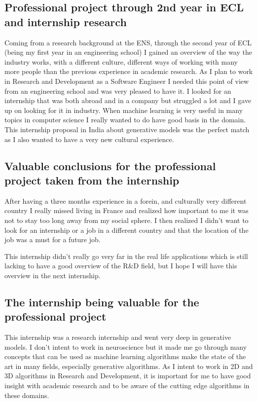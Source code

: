 \subsection{Professional project through 2nd year in ECL and internship
research}

Coming from a research background at the ENS, through the second year of ECL
(being my first year in an engineering school) I gained an overview of the way
the industry works, with a different culture, different ways of working with
many more people than the previous experience in academic research. As I plan to
work in Research and Development as a Software Engineer I needed this point of
view from an engineering school and was very pleased to have it. I looked for an
internship that was both abroad and in a company but struggled a lot and I gave
up on looking for it in industry. When machine learning is very useful in many
topics in computer science I really wanted to do have good basis in the domain.
This internship proposal in India about generative models was the perfect match
as I also wanted to have a very new cultural experience.

\subsection{Valuable conclusions for the professional project taken from the
internship}

After having a three months experience in a forein, and culturally very
different country I really missed living in France and realized how important to
me it was not to stay too long away from my social sphere. I then realized I
didn't want to look for an internship or a job in a different country and that
the location of the job was a must for a future job. 

This internship didn't really go very far in the real life applications which is
still lacking to have a good overview of the R\&D field, but I hope I will have
this overview in the next internship.

\subsection{The internship being valuable for the professional project}

This internship was a research internship and went very deep in generative
models. I don't intent to work in neuroscience but it made me go through many
concepts that can be used as machine learning algorithms make the state of the
art in many fields, especially generative algorithms. As I intent to work in 2D
and 3D algorithms in Research and Development, it is important for me to have
good insight with academic research and to be aware of the cutting edge
algorithms in these domains.

